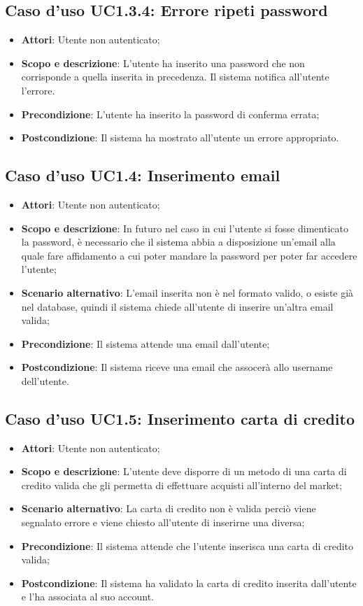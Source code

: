 \documentclass[12pt,a4paper,titlepage]{article}
\begin{document}
	\subsection{Caso d'uso UC1.3.4: Errore ripeti password}
	\label{UC1.3.4}
	\begin{itemize}
		\item \textbf{Attori}: Utente non autenticato;
		\item \textbf{Scopo e descrizione}: L'utente ha inserito una password che non corrisponde a quella inserita in precedenza. Il sistema notifica all'utente l'errore.
		\item \textbf{Precondizione}: L'utente ha inserito la password di conferma errata;
		\item \textbf{Postcondizione}: Il sistema ha mostrato all'utente un errore appropriato.
	\end{itemize}

	\subsection{Caso d'uso UC1.4: Inserimento email}
	\label{UC1.4}
	\begin{itemize}
		\item \textbf{Attori}: Utente non autenticato;
		\item \textbf{Scopo e descrizione}: In futuro nel caso in cui l'utente si fosse dimenticato la password, è necessario che il sistema abbia a disposizione un'email alla quale fare affidamento a cui poter mandare la password per poter far accedere l'utente;
		\item \textbf{Scenario alternativo}: L'email inserita non è nel formato valido, o esiste già nel database, quindi il sistema chiede all'utente di inserire un'altra email valida;
		\item \textbf{Precondizione}: Il sistema attende una email dall'utente;
		\item \textbf{Postcondizione}: Il sistema riceve una email che assocerà allo username dell'utente.
	\end{itemize}

	\subsection{Caso d'uso UC1.5: Inserimento carta di credito}
	\label{UC1.5}
	\begin{itemize}
		\item \textbf{Attori}: Utente non autenticato;
		\item \textbf{Scopo e descrizione}: L'utente deve disporre di un metodo di una carta di credito valida che gli permetta di effettuare acquisti all'interno del market;
		\item \textbf{Scenario alternativo}: La carta di credito non è valida perciò viene segnalato errore e viene chiesto all'utente di inserirne una diversa;
		\item \textbf{Precondizione}: Il sistema attende che l'utente inserisca una carta di credito valida;
		\item \textbf{Postcondizione}: Il sistema ha validato la carta di credito inserita dall'utente e l'ha associata al suo account.
	\end{itemize}
\end{document}
